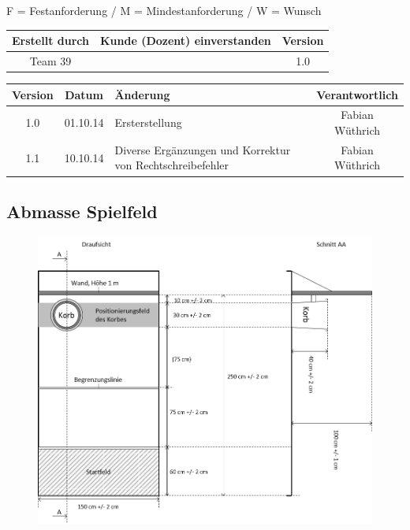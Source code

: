 
F = Festanforderung / M = Mindestanforderung / W = Wunsch

\renewcommand{\arraystretch}{1.5}


\begin{table}[!h]
	\begin{tabularx}{\columnwidth}{|c|X|c|}
		\hline Erstellt durch & Kunde (Dozent) einverstanden & Version \\ 
		\hline \parbox[0pt][3em][c]{0cm}{} Team 39 &  & 1.0 \\
		\hline 
	\end{tabularx}
\end{table}	

\begin{table}[!h]
	\begin{tabularx}{\columnwidth}{|c|c|X|c|}
		\hline Version & Datum & Änderung & Verantwortlich \\ 
		\hline 1.0 & 01.10.14 & Ersterstellung & Fabian Wüthrich \\ 
		\hline 1.1 & 10.10.14 & Diverse Ergänzungen und Korrektur von Rechtschreibefehler & Fabian Wüthrich \\ 
		\hline 
	\end{tabularx}
\end{table}	

\begin{appendices}
	\chapter{Abmasse Spielfeld}\label{app:spielfeld} 
	\begin{figure}[!h]
		\centering
		\includegraphics[width=0.7\linewidth]{../../fig/spielfeld}
		\label{fig:Bild1}
	\end{figure}
\end{appendices}